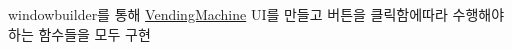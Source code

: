 
\begin{DoxyRefList}
\item[\label{todo__todo000001}%
\hypertarget{todo__todo000001}{}%
클래스 \hyperlink{class_vending_machine_1_1_machine_u_i}{Vending\+Machine.Machine\+UI} ]windowbuilder를 통해 \hyperlink{namespace_vending_machine}{Vending\+Machine} U\+I를 만들고 버튼을 클릭함에따라 수행해야 하는 함수들을 모두 구현 
\end{DoxyRefList}